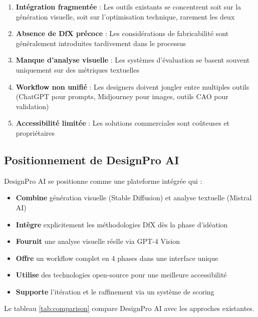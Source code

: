 \begin{enumerate}[leftmargin=*]
    \item \textbf{Intégration fragmentée} : Les outils existants se concentrent soit sur la génération visuelle, soit sur l'optimisation technique, rarement les deux
    
    \item \textbf{Absence de DfX précoce} : Les considérations de fabricabilité sont généralement introduites tardivement dans le processus
    
    \item \textbf{Manque d'analyse visuelle} : Les systèmes d'évaluation se basent souvent uniquement sur des métriques textuelles
    
    \item \textbf{Workflow non unifié} : Les designers doivent jongler entre multiples outils (ChatGPT pour prompts, Midjourney pour images, outils CAO pour validation)
    
    \item \textbf{Accessibilité limitée} : Les solutions commerciales sont coûteuses et propriétaires
\end{enumerate}

\subsection{Positionnement de DesignPro AI}

DesignPro AI se positionne comme une plateforme intégrée qui :

\begin{itemize}[leftmargin=*]
    \item \textbf{Combine} génération visuelle (Stable Diffusion) et analyse textuelle (Mistral AI)
    \item \textbf{Intègre} explicitement les méthodologies DfX dès la phase d'idéation
    \item \textbf{Fournit} une analyse visuelle réelle via GPT-4 Vision
    \item \textbf{Offre} un workflow complet en 4 phases dans une interface unique
    \item \textbf{Utilise} des technologies open-source pour une meilleure accessibilité
    \item \textbf{Supporte} l'itération et le raffinement via un système de scoring
\end{itemize}

Le tableau \ref{tab:comparison} compare DesignPro AI avec les approches existantes.

